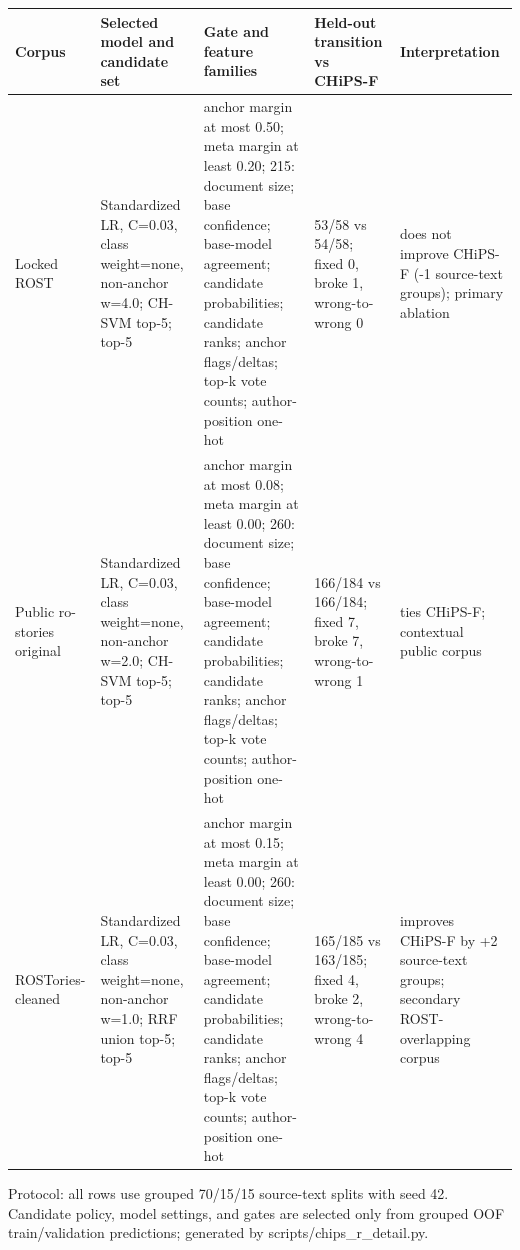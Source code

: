 \begin{table}
  {\tablefont\begin{tabular}{@{}p{}p{}p{}p{}p{}@{}}
    \hline
    Corpus & Selected model and candidate set & Gate and feature families & Held-out transition vs CHiPS-F & Interpretation\\
    \hline
    Locked ROST & Standardized LR, C=0.03, class weight=none, non-anchor w=4.0; CH-SVM top-5; top-5 & anchor margin at most 0.50; meta margin at least 0.20; 215: document size; base confidence; base-model agreement; candidate probabilities; candidate ranks; anchor flags/deltas; top-k vote counts; author-position one-hot & 53/58 vs 54/58; fixed 0, broke 1, wrong-to-wrong 0 & does not improve CHiPS-F (-1 source-text groups); primary ablation\\
    Public ro-stories original & Standardized LR, C=0.03, class weight=none, non-anchor w=2.0; CH-SVM top-5; top-5 & anchor margin at most 0.08; meta margin at least 0.00; 260: document size; base confidence; base-model agreement; candidate probabilities; candidate ranks; anchor flags/deltas; top-k vote counts; author-position one-hot & 166/184 vs 166/184; fixed 7, broke 7, wrong-to-wrong 1 & ties CHiPS-F; contextual public corpus\\
    ROSTories-cleaned & Standardized LR, C=0.03, class weight=none, non-anchor w=1.0; RRF union top-5; top-5 & anchor margin at most 0.15; meta margin at least 0.00; 260: document size; base confidence; base-model agreement; candidate probabilities; candidate ranks; anchor flags/deltas; top-k vote counts; author-position one-hot & 165/185 vs 163/185; fixed 4, broke 2, wrong-to-wrong 4 & improves CHiPS-F by +2 source-text groups; secondary ROST-overlapping corpus\\
    \hline
  \end{tabular}}
  {\begin{tabnote}Protocol: all rows use grouped 70/15/15 source-text splits with seed 42. Candidate policy, model settings, and gates are selected only from grouped OOF train/validation predictions; generated by scripts/chips\_r\_detail.py.\end{tabnote}}
\end{table}
